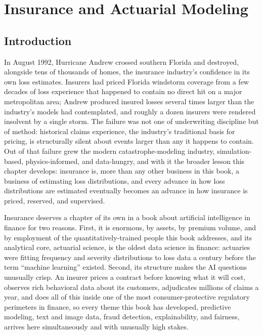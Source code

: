 \documentclass[../ai_in_finance]{subfiles}
\begin{document}
\chapter{Insurance and Actuarial Modeling}

\section{Introduction}

In August 1992, Hurricane Andrew crossed southern Florida and destroyed, alongside tens of thousands of homes, the insurance industry's confidence in its own loss estimates. Insurers had priced Florida windstorm coverage from a few decades of loss experience that happened to contain no direct hit on a major metropolitan area; Andrew produced insured losses several times larger than the industry's models had contemplated, and roughly a dozen insurers were rendered insolvent by a single storm. The failure was not one of underwriting discipline but of method: historical claims experience, the industry's traditional basis for pricing, is structurally silent about events larger than any it happens to contain. Out of that failure grew the modern catastrophe-modeling industry, simulation-based, physics-informed, and data-hungry, and with it the broader lesson this chapter develops: insurance is, more than any other business in this book, a business of estimating loss distributions, and every advance in how loss distributions are estimated eventually becomes an advance in how insurance is priced, reserved, and supervised.

Insurance deserves a chapter of its own in a book about artificial intelligence in finance for two reasons. First, it is enormous, by assets, by premium volume, and by employment of the quantitatively-trained people this book addresses, and its analytical core, actuarial science, is the oldest data science in finance: actuaries were fitting frequency and severity distributions to loss data a century before the term ``machine learning'' existed. Second, its structure makes the AI questions unusually crisp. An insurer prices a contract before knowing what it will cost, observes rich behavioral data about its customers, adjudicates millions of claims a year, and does all of this inside one of the most consumer-protective regulatory perimeters in finance, so every theme this book has developed, predictive modeling, text and image data, fraud detection, explainability, and fairness, arrives here simultaneously and with unusually high stakes.
\end{document}
